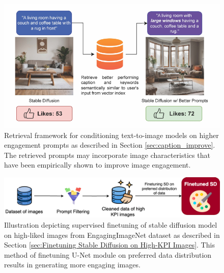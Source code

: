  \begin{figure}[]
     \centering
     \includegraphics[width=0.8\columnwidth]{images/sd_prompt_improvement_.pdf}
     \caption{\label{fig:sd_prompt_improve}
     Retrieval framework for conditioning text-to-image models on higher engagement prompts as described in Section \ref{sec:caption_improve}. The retrieved prompts may incorporate image characteristics that have been empirically shown to improve image engagement.}
   \end{figure}

 \begin{figure}[]
     \centering
     \includegraphics[width=\columnwidth]{images/sd_preferred_finetuning.png}
     \caption{\label{fig:sd_preferred_finetuning}
     Illustration depicting supervised finetuning of stable diffusion model on high-liked images from EngagingImageNet dataset as described in Section \ref{sec:Finetuning Stable Diffusion on High-KPI Images}. This method of finetuning U-Net module on preferred data distribution results in generating more engaging images.}
   \end{figure}


